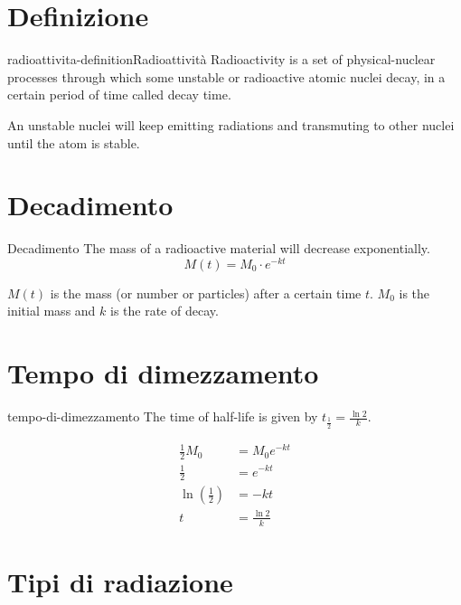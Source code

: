 \documentclass[preview]{standalone}
\begin{document}
\genpage

\section{Definizione}

\begin{snippetdefinition}{radioattivita-definition}{Radioattività}
    Radioactivity is a set of physical-nuclear processes
through which some unstable or radioactive atomic nuclei decay,
in a certain period of time called decay time.
\end{snippetdefinition}

\begin{plainhtml}
    An unstable nuclei will keep emitting radiations
    and transmuting to other nuclei until the atom is stable.
\end{plainhtml}

\section{Decadimento}

\begin{snippet}{Decadimento}
    The mass of a radioactive material will decrease exponentially.
    \[
        M(t) = M_0 \cdot e^{-kt}
    \]

    \(M(t)\) is the mass (or number or particles)
    after a certain time \(t\). \(M_0\) is the initial mass
    and \(k\) is the rate of decay.
\end{snippet}

\section{Tempo di dimezzamento}

\begin{snippet}{tempo-di-dimezzamento}
    The time of half-life is given by \(t_\frac{1}{2} = \frac{\ln 2}{k}\).

    \begin{align*}
        \frac{1}{2}M_0 &= M_0 e^{-kt} \\
        \frac{1}{2} &= e^{-kt} \\
        \ln\left(\frac{1}{2}\right) &= -kt \\
        t &= \frac{\ln 2}{k}
    \end{align*}
\end{snippet}

\section{Tipi di radiazione}
\end{document}
